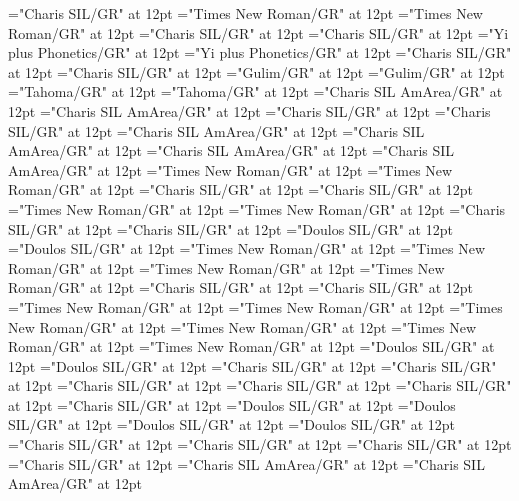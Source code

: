 \documentclass[a4paper,twoside]{article}
\begin{document}
\font\spanidZxxxxaudio="Charis SIL/GR" at 12pt
\font\divid="Times New Roman/GR" at 12pt
\font\spanid="Times New Roman/GR" at 12pt
\font\diviixpin="Charis SIL/GR" at 12pt
\font\spaniixpin="Charis SIL/GR" at 12pt
\font\divii="Yi plus Phonetics/GR" at 12pt
\font\spanii="Yi plus Phonetics/GR" at 12pt
\font\divkm="Charis SIL/GR" at 12pt
\font\spankm="Charis SIL/GR" at 12pt
\font\divko="Gulim/GR" at 12pt
\font\spanko="Gulim/GR" at 12pt
\font\divlv="Tahoma/GR" at 12pt
\font\spanlv="Tahoma/GR" at 12pt
\font\divmiz="Charis SIL AmArea/GR" at 12pt
\font\spanmiz="Charis SIL AmArea/GR" at 12pt
\font\divms="Charis SIL/GR" at 12pt
\font\spanms="Charis SIL/GR" at 12pt
\font\divmxbfonipa="Charis SIL AmArea/GR" at 12pt
\font\spanmxbfonipa="Charis SIL AmArea/GR" at 12pt
\font\divmxb="Charis SIL AmArea/GR" at 12pt
\font\spanmxb="Charis SIL AmArea/GR" at 12pt
\font\divmy="Times New Roman/GR" at 12pt
\font\spanmy="Times New Roman/GR" at 12pt
\font\divne="Charis SIL/GR" at 12pt
\font\spanne="Charis SIL/GR" at 12pt
\font\divpt="Times New Roman/GR" at 12pt
\font\spanpt="Times New Roman/GR" at 12pt
\font\divqaafonipaxkal="Charis SIL/GR" at 12pt
\font\spanqaafonipaxkal="Charis SIL/GR" at 12pt
\font\divqaafonipaxyii="Doulos SIL/GR" at 12pt
\font\spanqaafonipaxyii="Doulos SIL/GR" at 12pt
\font\divqaaxfwt="Times New Roman/GR" at 12pt
\font\spanqaaxfwt="Times New Roman/GR" at 12pt
\font\divqaaxgot="Times New Roman/GR" at 12pt
\font\spanqaaxgot="Times New Roman/GR" at 12pt
\font\divqaaxkal="Charis SIL/GR" at 12pt
\font\spanqaaxkal="Charis SIL/GR" at 12pt
\font\divqaaxlel="Times New Roman/GR" at 12pt
\font\spanqaaxlel="Times New Roman/GR" at 12pt
\font\divqaaxpig="Times New Roman/GR" at 12pt
\font\spanqaaxpig="Times New Roman/GR" at 12pt
\font\divqaaxsim="Times New Roman/GR" at 12pt
\font\spanqaaxsim="Times New Roman/GR" at 12pt
\font\divqaaxsta="Doulos SIL/GR" at 12pt
\font\spanqaaxsta="Doulos SIL/GR" at 12pt
\font\divqaaZxxxxkalAUDIO="Charis SIL/GR" at 12pt
\font\spanqaaZxxxxkalAUDIO="Charis SIL/GR" at 12pt
\font\divro="Charis SIL/GR" at 12pt
\font\spanro="Charis SIL/GR" at 12pt
\font\divru="Charis SIL/GR" at 12pt
\font\spanru="Charis SIL/GR" at 12pt
\font\divsehfonipaxetic="Doulos SIL/GR" at 12pt
\font\spansehfonipaxetic="Doulos SIL/GR" at 12pt
\font\divsehfonipa="Doulos SIL/GR" at 12pt
\font\spansehfonipa="Doulos SIL/GR" at 12pt
\font\divsehZxxxxaudio="Charis SIL/GR" at 12pt
\font\spansehZxxxxaudio="Charis SIL/GR" at 12pt
\font\divseh="Charis SIL/GR" at 12pt
\font\spanseh="Charis SIL/GR" at 12pt
\font\divstp="Charis SIL AmArea/GR" at 12pt
\font\spanstp="Charis SIL AmArea/GR" at 12pt
\end{document}
